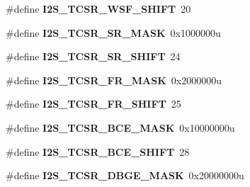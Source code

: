 \begin{DoxyCompactItemize}
\item 
\hypertarget{group___i2_s___register___masks_gafbec49ae50a286ce9bc59f20cbcd6b4e}{}\#define {\bfseries I2\+S\+\_\+\+T\+C\+S\+R\+\_\+\+W\+S\+F\+\_\+\+S\+H\+I\+F\+T}~20\label{group___i2_s___register___masks_gafbec49ae50a286ce9bc59f20cbcd6b4e}

\item 
\hypertarget{group___i2_s___register___masks_ga0f5f12f7b64d57e778e3025ce7cb1294}{}\#define {\bfseries I2\+S\+\_\+\+T\+C\+S\+R\+\_\+\+S\+R\+\_\+\+M\+A\+S\+K}~0x1000000u\label{group___i2_s___register___masks_ga0f5f12f7b64d57e778e3025ce7cb1294}

\item 
\hypertarget{group___i2_s___register___masks_gab1a40505d50cdd19b7e37eaa0d6cc184}{}\#define {\bfseries I2\+S\+\_\+\+T\+C\+S\+R\+\_\+\+S\+R\+\_\+\+S\+H\+I\+F\+T}~24\label{group___i2_s___register___masks_gab1a40505d50cdd19b7e37eaa0d6cc184}

\item 
\hypertarget{group___i2_s___register___masks_gab914972c0af99c736c0873d7c9f325f6}{}\#define {\bfseries I2\+S\+\_\+\+T\+C\+S\+R\+\_\+\+F\+R\+\_\+\+M\+A\+S\+K}~0x2000000u\label{group___i2_s___register___masks_gab914972c0af99c736c0873d7c9f325f6}

\item 
\hypertarget{group___i2_s___register___masks_gaee3fc16502863ff4fa31702ca5add676}{}\#define {\bfseries I2\+S\+\_\+\+T\+C\+S\+R\+\_\+\+F\+R\+\_\+\+S\+H\+I\+F\+T}~25\label{group___i2_s___register___masks_gaee3fc16502863ff4fa31702ca5add676}

\item 
\hypertarget{group___i2_s___register___masks_ga1a283a2875596890e8d014ba29a2d764}{}\#define {\bfseries I2\+S\+\_\+\+T\+C\+S\+R\+\_\+\+B\+C\+E\+\_\+\+M\+A\+S\+K}~0x10000000u\label{group___i2_s___register___masks_ga1a283a2875596890e8d014ba29a2d764}

\item 
\hypertarget{group___i2_s___register___masks_gabcf492ab7f9cc04accd4b8d144a195d8}{}\#define {\bfseries I2\+S\+\_\+\+T\+C\+S\+R\+\_\+\+B\+C\+E\+\_\+\+S\+H\+I\+F\+T}~28\label{group___i2_s___register___masks_gabcf492ab7f9cc04accd4b8d144a195d8}

\item 
\hypertarget{group___i2_s___register___masks_ga168b4f72e1d68208f211020224bc4f1d}{}\#define {\bfseries I2\+S\+\_\+\+T\+C\+S\+R\+\_\+\+D\+B\+G\+E\+\_\+\+M\+A\+S\+K}~0x20000000u\label{group___i2_s___register___masks_ga168b4f72e1d68208f211020224bc4f1d}


\end{DoxyCompactItemize}
